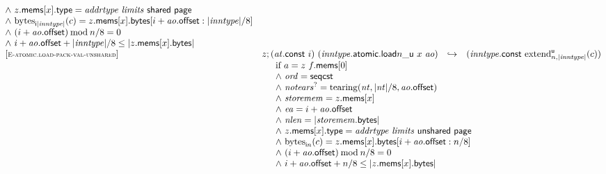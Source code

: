 $$\begin{array}[t]{@{}lrcl@{}l@{}}
{\begin{array}[t]{@{}l@{}}
{\land}~ z{.}\mathsf{mems}{}[x]{.}\mathsf{type} = {\mathit{addrtype}}~{\mathit{limits}}~\mathsf{shared}~\mathsf{page} \\
{\land}~ {{\mathrm{bytes}}}_{{\mathsf{i}}{{|{\mathit{inntype}}|}}}(c) = z{.}\mathsf{mems}{}[x]{.}\mathsf{bytes}{}[i + {\mathit{ao}}{.}\mathsf{offset} : {|{\mathit{inntype}}|} / 8] \\
{\land}~ (i + {\mathit{ao}}{.}\mathsf{offset}) \mathbin{\mathrm{mod}} n / 8 = 0 \\
{\land}~ i + {\mathit{ao}}{.}\mathsf{offset} + {|{\mathit{inntype}}|} / 8 \leq {|z{.}\mathsf{mems}{}[x]{.}\mathsf{bytes}|} \\
\end{array}
} \\
{[\textsc{\scriptsize E{-}atomic.load{-}pack{-}val{-}unshared}]} \quad & z ; ({\mathit{at}}{.}\mathsf{const}~i)~({{\mathit{inntype}}{.}\mathsf{atomic}{.}\mathsf{load}}{{n}{\mathsf{\_}}{\mathsf{u}}}~x~{\mathit{ao}}) & \hookrightarrow & ({\mathit{inntype}}{.}\mathsf{const}~{{{{\mathrm{extend}}}_{n, {|{\mathit{inntype}}|}}^{\mathsf{u}}}}{(c)}) &  \\
& \multicolumn{4}{@{}l@{}}{\quad
\quad
\begin{array}[t]{@{}l@{}}
\mbox{if}~ a = z~f{.}\mathsf{mems}{}[0] \\
{\land}~ {\mathit{ord}} = \mathsf{seqcst} \\
{\land}~ {{\mathit{notears}}^?} = {\mathrm{tearing}}({\mathit{nt}}, {|{\mathit{nt}}|} / 8, {\mathit{ao}}{.}\mathsf{offset}) \\
{\land}~ {\mathit{storemem}} = z{.}\mathsf{mems}{}[x] \\
{\land}~ {\mathit{ea}} = i + {\mathit{ao}}{.}\mathsf{offset} \\
{\land}~ {\mathit{nlen}} = {|{\mathit{storemem}}{.}\mathsf{bytes}|} \\
{\land}~ z{.}\mathsf{mems}{}[x]{.}\mathsf{type} = {\mathit{addrtype}}~{\mathit{limits}}~\mathsf{unshared}~\mathsf{page} \\
{\land}~ {{\mathrm{bytes}}}_{{\mathsf{i}}{n}}(c) = z{.}\mathsf{mems}{}[x]{.}\mathsf{bytes}{}[i + {\mathit{ao}}{.}\mathsf{offset} : n / 8] \\
{\land}~ (i + {\mathit{ao}}{.}\mathsf{offset}) \mathbin{\mathrm{mod}} n / 8 = 0 \\
{\land}~ i + {\mathit{ao}}{.}\mathsf{offset} + n / 8 \leq {|z{.}\mathsf{mems}{}[x]{.}\mathsf{bytes}|} \\
\end{array}
} \\

\end{array}$$
